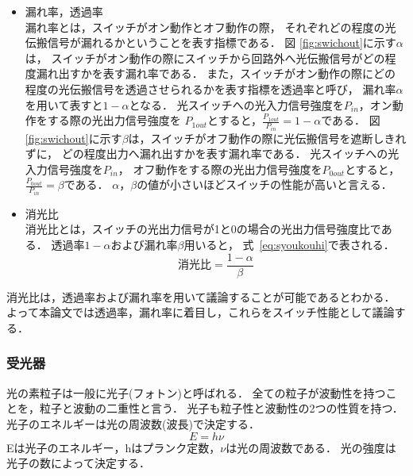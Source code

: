 \begin{itemize}
\item 漏れ率，透過率\\
漏れ率とは，スイッチがオン動作とオフ動作の際，
それぞれどの程度の光伝搬信号が漏れるかということを表す指標である．
図 \ref{fig:swichout}に示す$\alpha $は，
スイッチがオン動作の際にスイッチから回路外へ光伝搬信号がどの程度漏れ出すかを表す漏れ率である．
また，スイッチがオン動作の際にどの程度の光伝搬信号を透過させられるかを表す指標を透過率と呼び，
漏れ率$\alpha$を用いて表すと$1- \alpha$となる．
光スイッチへの光入力信号強度を$P_{in}$，オン動作をする際の光出力信号強度を
$P_{1out}$とすると，$\frac{P_{1out}}{P_{in}}=1- \alpha$である．
図 \ref{fig:swichout}に示す$\beta $は，スイッチがオフ動作の際に光伝搬信号を遮断しきれずに，
どの程度出力へ漏れ出すかを表す漏れ率である．
光スイッチへの光入力信号強度を$P_{in}$，
オフ動作をする際の光出力信号強度を$P_{0out}$とすると，
$\frac{P_{0out}}{P_{in}}=\beta$である．
$\alpha $，$ \beta $の値が小さいほどスイッチの性能が高いと言える．
\item 消光比\\
消光比とは，スイッチの光出力信号が1と0の場合の光出力信号強度比である．
透過率$1- \alpha$および漏れ率$\beta $用いると，
式~\eqref{eq:syoukouhi}で表される．
\begin{equation}
消光比= \frac{1- \alpha}{\beta}
\label{eq:syoukouhi}
\end{equation}
\end{itemize}

消光比は，透過率および漏れ率を用いて議論することが可能であるとわかる．
よって本論文では透過率，漏れ率に着目し，これらをスイッチ性能として議論する．

\subsubsection{受光器}
光の素粒子は一般に光子(フォトン)と呼ばれる．
全ての粒子が波動性を持つことを，粒子と波動の二重性と言う．
光子も粒子性と波動性の2つの性質を持つ\cite{大津}．
光子のエネルギーは光の周波数(波長)で決定する．
\begin{equation}
E = h \nu \label{eq:hikarienergy}
\end{equation}
Eは光子のエネルギー，hはプランク定数，$\nu$は光の周波数である．
光の強度は光子の数によって決定する．

